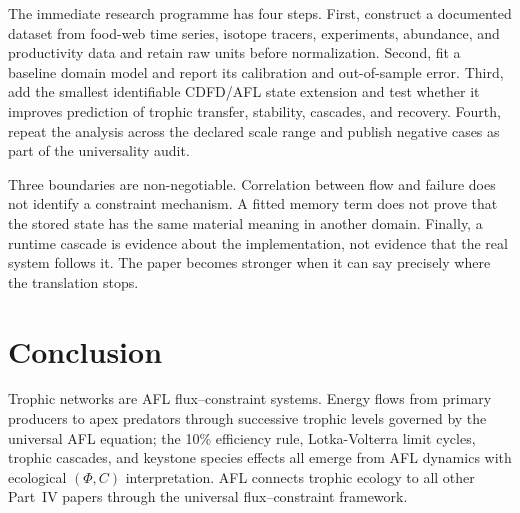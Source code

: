 \documentclass[11pt]{article}
\begin{document}
The immediate research programme has four steps. First, construct a documented
dataset from food-web time series, isotope tracers, experiments, abundance, and productivity data and retain raw units before normalization.
Second, fit a baseline domain model and report its calibration and out-of-sample
error. Third, add the smallest identifiable CDFD/AFL state extension and test
whether it improves prediction of trophic transfer, stability, cascades, and recovery. Fourth, repeat the
analysis across the declared scale range and publish negative cases as part of
the universality audit.

Three boundaries are non-negotiable. Correlation between flow and failure does
not identify a constraint mechanism. A fitted memory term does not prove that
the stored state has the same material meaning in another domain. Finally, a
runtime cascade is evidence about the implementation, not evidence that the
real system follows it. The paper becomes stronger when it can say precisely
where the translation stops.



\section{Conclusion}

Trophic networks are AFL flux--constraint systems. Energy flows from primary producers to apex
predators through successive trophic levels governed by the universal AFL equation; the 10\%
efficiency rule, Lotka-Volterra limit cycles, trophic cascades, and keystone species effects
all emerge from AFL dynamics with ecological $(\Phi, C)$ interpretation. AFL connects trophic
ecology to all other Part~IV papers through the universal flux--constraint framework.



\end{document}

